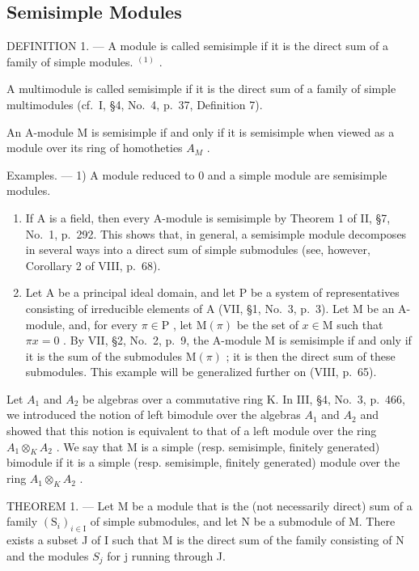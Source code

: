 \subsection{Semisimple Modules}

DEFINITION 1. --- A module is called semisimple if it is the direct sum of a family of simple modules. \(^{(1)}\) .

A multimodule is called semisimple if it is the direct sum of a family of simple multimodules (cf.~I, §4, No.~4, p.~37, Definition 7).

An A-module M is semisimple if and only if it is semisimple when viewed as a module over its ring of homotheties \(A_{M}\) .

Examples. --- 1) A module reduced to 0 and a simple module are semisimple modules.

\begin{enumerate}
\def\labelenumi{\arabic{enumi})}
\setcounter{enumi}{1}
\item
  If A is a field, then every A-module is semisimple by Theorem 1 of II, §7, No.~1, p.~292. This shows that, in general, a semisimple module decomposes in several ways into a direct sum of simple submodules (see, however, Corollary 2 of VIII, p.~68).
\item
  Let A be a principal ideal domain, and let P be a system of representatives consisting of irreducible elements of A (VII, §1, No.~3, p.~3). Let M be an A-module, and, for every \(\pi \in \mathrm{P}\) , let \(\mathrm{M}(\pi)\) be the set of \(x \in \mathrm{M}\) such that \(\pi x = 0\) . By VII, §2, No.~2, p.~9, the A-module M is semisimple if and only if it is the sum of the submodules \(\mathrm{M}(\pi)\) ; it is then the direct sum of these submodules. This example will be generalized further on (VIII, p.~65).
\end{enumerate}

Let \(A_{1}\) and \(A_{2}\) be algebras over a commutative ring K. In III, §4, No.~3, p.~466, we introduced the notion of left bimodule over the algebras \(A_{1}\) and \(A_{2}\) and showed that this notion is equivalent to that of a left module over the ring \(A_{1} \otimes_{K} A_{2}\) . We say that M is a simple (resp. semisimple, finitely generated) bimodule if it is a simple (resp. semisimple, finitely generated) module over the ring \(A_{1} \otimes_{K} A_{2}\) .

THEOREM 1. --- Let M be a module that is the (not necessarily direct) sum of a family \((\mathrm{S}_{i})_{i\in\mathrm{I}}\) of simple submodules, and let N be a submodule of M. There exists a subset J of I such that M is the direct sum of the family consisting of N and the modules \(S_{j}\) for j running through J.

